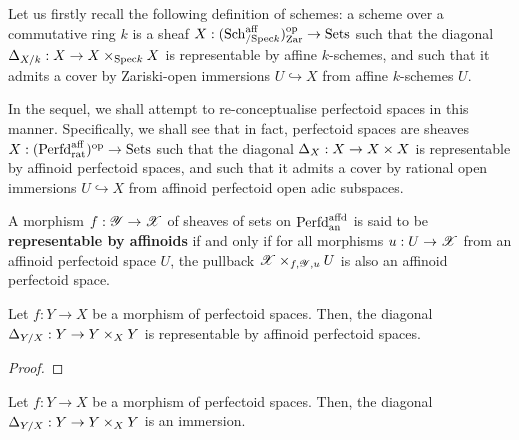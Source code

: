             \begin{remark} 
                Let us firstly recall the following definition of schemes: a scheme over a commutative ring $k$ is a sheaf $X: (\mathrm{Sch}_{/\mathrm{Spec} k}^{\mathrm{aff}})_{\mathrm{Zar}}^{\mathrm{op}} \to \mathrm{Sets}$ such that the diagonal $\Delta_{X/k}: X \to X \x_{\Spec k} X$ is representable by affine $k$-schemes, and such that it admits a cover by Zariski-open immersions $U \hookrightarrow X$ from affine $k$-schemes $U$.
                
                In the sequel, we shall attempt to re-conceptualise perfectoid spaces in this manner. Specifically, we shall see that in fact, perfectoid spaces are sheaves $X: (\mathrm{Perfd}^{\mathrm{aff}}_{\mathrm{rat}})^{\mathrm{op}} \to \mathrm{Sets}$ such that the diagonal $\Delta_X: X \to X \x X$ is representable by affinoid perfectoid spaces, and such that it admits a cover by rational open immersions $U \hookrightarrow X$ from affinoid perfectoid open adic subspaces. 
            \end{remark}
            \begin{definition} \label{def: representable_morphisms_of_perfectoid_spaces}
                A morphism $f: \mathscr{Y} \to \mathscr{X}$ of sheaves of sets on $\mathrm{Perfd}^{\mathrm{affd}}_{\mathrm{an}}$ is said to be \textbf{representable by affinoids} if and only if for all morphisms $u: U \to \mathscr{X}$ from an affinoid perfectoid space $U$, the pullback $\scrX \x_{f, \scrY, u} U$ is also an affinoid perfectoid space. 
            \end{definition}
            \begin{lemma} \label{lemma: diagonals_of_perfectoid_spaces_are_representable_by_affinoids}
                Let $f: Y \to X$ be a morphism of perfectoid spaces. Then, the diagonal $\Delta_{Y/X}: Y \to Y \x_X Y$ is representable by affinoid perfectoid spaces.
            \end{lemma}
                \begin{proof}
                    
                \end{proof}
            \begin{proposition} \label{prop: diagonals_of_perfectoid_spaces_are_immersions} 
                Let $f: Y \to X$ be a morphism of perfectoid spaces. Then, the diagonal $\Delta_{Y/X}: Y \to Y \x_X Y$ is an immersion.
            \end{proposition}
